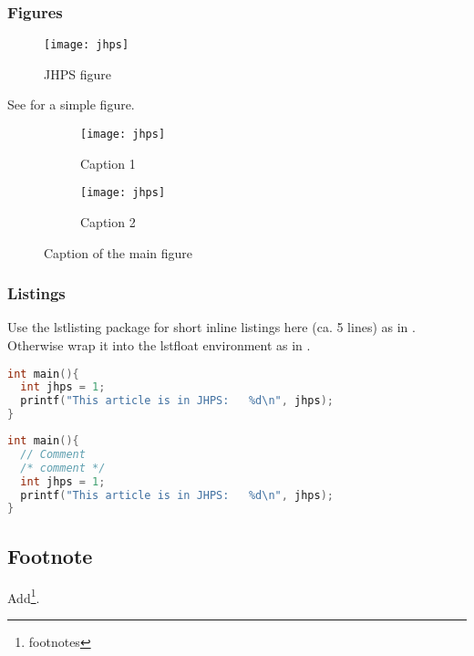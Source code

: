 \documentclass{jhps}
\begin{document}
\subsubsection{Figures}

\begin{figure}   %
\texttt{[image: jhps]}
\caption{JHPS figure}
\label{fig:jhps}
\end{figure}

See  for a simple figure.

\begin{figure}
  \begin{subfigure}[t]{3cm}
  \texttt{[image: jhps]}
  \caption{Caption 1}\label{fig:1a}
  \end{subfigure}
  \quad
  \begin{subfigure}[t]{3cm}
  \texttt{[image: jhps]}
  \caption{Caption 2}\label{fig:1b}
  \end{subfigure}
  \caption{Caption of the main figure}\label{fig:1}
\end{figure}


\subsubsection{Listings}

Use the lstlisting package for short inline listings here (ca.
5 lines) as in .
Otherwise wrap it into the lstfloat environment as in .

\begin{lstlisting}[caption="My listing",label=lst:listing,language=C,inputencoding={utf8},extendedchars=false]
int main(){
  int jhps = 1;
  printf("This article is in JHPS:   %d\n", jhps);
}
\end{lstlisting}

\begin{lstfloat}[h]
  \begin{lstlisting}[caption="My longer listing",label={lst:longlisting},language=C]
int main(){
  // Comment
  /* comment */
  int jhps = 1;
  printf("This article is in JHPS:   %d\n", jhps);
}
  \end{lstlisting}
\end{lstfloat}


\subsection{Footnote}
Add\footnote{footnotes}.
\end{document}
